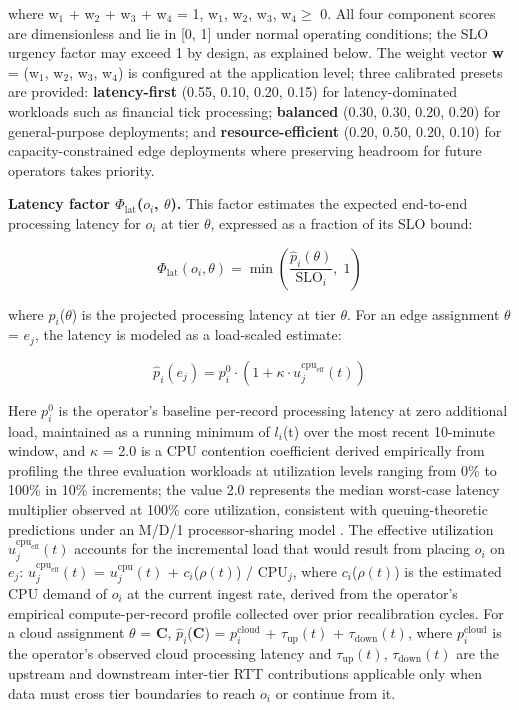 \documentclass[preprint,review,12pt]{elsarticle}
\begin{document}
where w$_1$ + w$_2$ + w$_3$ + w$_4$ = 1, w$_1$, w$_2$, w$_3$, w$_4\geq$ 0. All four component scores are dimensionless and lie in {[}0, 1{]} under normal operating conditions; the SLO urgency factor may exceed 1 by design, as explained below. The weight vector \textbf{w} = (w$_1$, w$_2$, w$_3$, w$_4$) is configured at the application level; three calibrated presets are provided: \textbf{latency-first} (0.55, 0.10, 0.20, 0.15) for latency-dominated workloads such as financial tick processing; \textbf{balanced} (0.30, 0.30, 0.20, 0.20) for general-purpose deployments; and \textbf{resource-efficient} (0.20, 0.50, 0.20, 0.10) for capacity-constrained edge deployments where preserving headroom for future operators takes priority.

\textbf{Latency factor $\Phi_{\text{lat}}$($o_i$, $\theta$).} This factor estimates the expected end-to-end processing latency for $o_i$ at tier $\theta$, expressed as a fraction of its SLO bound:

\begin{equation}
\Phi_{\text{lat}}(o_i, \theta) = \min\left(\frac{\hat{p}_i(\theta)}{\text{SLO}_i},\; 1\right)
\label{eq:phi-lat}
\end{equation}

where $\hat{p}_i$($\theta$) is the projected processing latency at tier $\theta$. For an edge assignment $\theta$ = $e_j$, the latency is modeled as a load-scaled estimate:

\begin{equation}
\hat{p}_i(e_j) = p_i^0 \cdot \left(1 + \kappa \cdot u_j^{\text{cpu}_{\text{eff}}}(t)\right)
\label{eq:p-hat}
\end{equation}

Here $p_i^0$ is the operator's baseline per-record processing latency at zero additional load, maintained as a running minimum of $l_i$(t) over the most recent 10-minute window, and $\kappa$ = 2.0 is a CPU contention coefficient derived empirically from profiling the three evaluation workloads at utilization levels ranging from 0\% to 100\% in 10\% increments; the value 2.0 represents the median worst-case latency multiplier observed at 100\% core utilization, consistent with queuing-theoretic predictions under an M/D/1 processor-sharing model \cite{kleinrock1975queueing}. The effective utilization $u_j^{\text{cpu}_{\text{eff}}}(t)$ accounts for the incremental load that would result from placing $o_i$ on $e_j$: $u_j^{\text{cpu}_{\text{eff}}}(t)$ = $u_j^{\text{cpu}}(t)$ + $c_i$($\rho(t)$) / $\text{CPU}_j$, where $c_i$($\rho(t)$) is the estimated CPU demand of $o_i$ at the current ingest rate, derived from the operator's empirical compute-per-record profile collected over prior recalibration cycles. For a cloud assignment $\theta$ = \textbf{C}, $\hat{p}_i$(\textbf{C}) = $p_i^{\text{cloud}}$ + $\tau_{\text{up}}(t)$ + $\tau_{\text{down}}(t)$, where $p_i^{\text{cloud}}$ is the operator's observed cloud processing latency and $\tau_{\text{up}}(t)$, $\tau_{\text{down}}(t)$ are the upstream and downstream inter-tier RTT contributions applicable only when data must cross tier boundaries to reach $o_i$ or continue from it.
\end{document}
